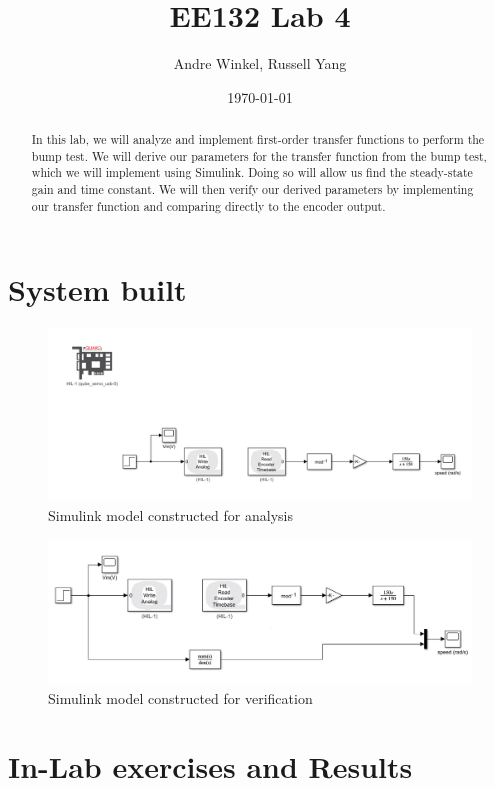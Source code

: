 \documentclass{article}
\title{EE132 Lab 4}
\author{Andre Winkel, Russell Yang}
\date{\today}
\begin{document}
\maketitle

\begin{abstract}
    In this lab, we will analyze and implement first-order transfer functions to perform the bump test. We will derive our parameters for the transfer function from the bump test, which we will implement using Simulink. Doing so will allow us find the steady-state gain and time constant. We will then verify our derived parameters by implementing our transfer function and comparing directly to the encoder output.
\end{abstract}

\section{System built} 
\begin{figure} [H]
    \centering
    \includegraphics[width=0.75\linewidth]{system1.png}
    \caption{Simulink model constructed for analysis}
    \label{fig:1}
\end{figure}
\begin{figure} [H]
    \centering
    \includegraphics[width=0.75\linewidth]{system2.png}
    \caption{Simulink model constructed for verification}
    \label{fig:2}
\end{figure}

\section{In-Lab exercises and Results}
\end{document}
